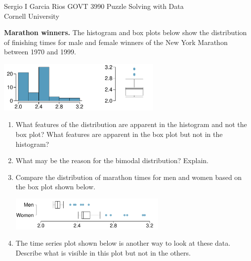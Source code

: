 \documentclass[12pt]{article}
\newcommand{\qt}[1]{\textcolor{custom_carnelian}{\textbf{#1.}}}
\begin{document}

Sergio I Garcia Rios \hfill GOVT 3990 Puzzle Solving with Data \\
Cornell University \hfill \\



\qt{Marathon winners\label{marathon_winners}} The histogram and box plots below show the distribution of finishing times for male and female winners of the New York Marathon between 1970 and 1999.
\begin{center}
\includegraphics[width=0.6\textwidth]{figures/marathon_winners_hist_box.pdf}
\end{center}
\begin{enumerate}
\item What features of the distribution are apparent in the histogram and not the box plot? What features are apparent in the box plot but not in the histogram?
\vspace{2cm}


\item What may be the reason for the bimodal distribution? Explain.

\vspace{2cm}


\item Compare the distribution of marathon times for men and women based on the box plot shown below.

\begin{center}
\includegraphics[width=0.6\textwidth]{figures/marathon_winners_gender_box.pdf}
\end{center}

\vspace{4cm}

\item The time series plot shown below is another way to look at these data. Describe what is visible in this plot but not in the others.
\vspace{2cm}

\end{enumerate}
\end{document}
